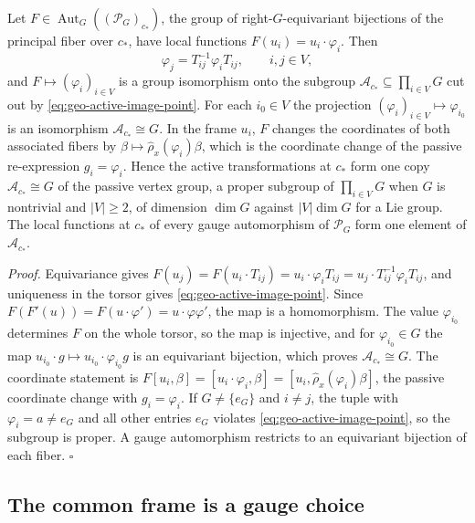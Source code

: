 Let $F\in\operatorname{Aut}_G((\mathscr P_G)_{c_*})$, the group of right-$G$-equivariant bijections of
the principal fiber over $c_*$, have local functions $F(u_i)=u_i\cdot\varphi_i$. Then
\begin{equation}
\varphi_j=T_{ij}^{-1}\varphi_iT_{ij},
\qquad i,j\in V,
\label{eq:geo-active-image-point}
\end{equation}
and $F\mapsto(\varphi_i)_{i\in V}$ is a group isomorphism onto the subgroup
$\mathcal A_{c_*}\subseteq\prod_{i\in V}G$ cut out by \eqref{eq:geo-active-image-point}. For each
$i_0\in V$ the projection $(\varphi_i)_{i\in V}\mapsto\varphi_{i_0}$ is an isomorphism
$\mathcal A_{c_*}\cong G$. In the frame $u_i$, $F$ changes the coordinates of both associated
fibers by $\beta\mapsto\widehat\rho_x(\varphi_i)\beta$, which is the coordinate change of the
passive re-expression $g_i=\varphi_i$. Hence the active transformations at $c_*$ form one copy
$\mathcal A_{c_*}\cong G$ of the passive vertex group, a proper subgroup of $\prod_{i\in V}G$ when
$G$ is nontrivial and $|V|\geq2$, of dimension $\dim G$ against $|V|\dim G$ for a Lie group. The
local functions at $c_*$ of every gauge automorphism of $\mathscr P_G$ form one element of
$\mathcal A_{c_*}$. 

\noindent\emph{Proof.}
Equivariance gives $F(u_j)=F(u_i\cdot T_{ij})=u_i\cdot\varphi_iT_{ij}=u_j\cdot T_{ij}^{-1}\varphi_iT_{ij}$,
and uniqueness in the torsor gives \eqref{eq:geo-active-image-point}. Since
$F(F'(u))=F(u\cdot\varphi')=u\cdot\varphi\varphi'$, the map is a homomorphism. The value
$\varphi_{i_0}$ determines $F$ on the whole torsor, so the map is injective, and for
$\varphi_{i_0}\in G$ the map $u_{i_0}\cdot g\mapsto u_{i_0}\cdot\varphi_{i_0}g$ is an equivariant
bijection, which proves $\mathcal A_{c_*}\cong G$. The coordinate statement is
$F[u_i,\beta]=[u_i\cdot\varphi_i,\beta]=[u_i,\widehat\rho_x(\varphi_i)\beta]$, the passive coordinate
change with $g_i=\varphi_i$. If $G\neq\{e_G\}$ and $i\neq j$, the tuple with $\varphi_i=a\neq e_G$ and
all other entries $e_G$ violates \eqref{eq:geo-active-image-point}, so the subgroup is proper. A gauge
automorphism restricts to an equivariant bijection of each fiber. \hfill$\square$

\subsection{The common frame is a gauge choice}
\label{sec:geo-diagonal}

